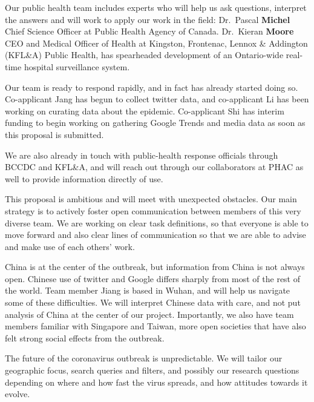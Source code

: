 Our public health team includes experts who will help us ask questions, interpret the answers and will work to apply our work in the field:
Dr.\ Pascal \textbf{Michel} Chief Science Officer at Public Health Agency of Canada. 
Dr.\ Kieran \textbf{Moore} CEO and Medical Officer of Health at Kingston, Frontenac, Lennox & Addington (KFL&A) Public Health, has spearheaded development of an Ontario-wide real-time hospital surveillance system.

Our team is ready to respond rapidly, and in fact has already started doing so. Co-applicant Jang has begun to collect twitter data, and co-applicant Li has been working on curating data about the epidemic. Co-applicant Shi has interim funding to begin working on gathering Google Trends and media data as soon as this proposal is submitted.

We are also already in touch with public-health response officials through BCCDC and KFL\&A, and will reach out through our collaborators at PHAC as well to provide information directly of use.


This proposal is ambitious and will meet with unexpected obstacles. Our main strategy is to actively foster open communication between members of this very diverse team. We are working on clear task definitions, so that everyone is able to move forward and also clear lines of communication so that we are able to advise and make use of each others' work.

China is at the center of the outbreak, but information from China is not always open. Chinese use of twitter and Google differs sharply from most of the rest of the world. Team member Jiang is based in Wuhan, and will help us navigate some of these difficulties. We will interpret Chinese data with care, and not put analysis of China at the center of our project. Importantly, we also have team members familiar with Singapore and Taiwan, more open societies that have also felt strong social effects from the outbreak.

The future of the coronavirus outbreak is unpredictable. We will tailor our geographic focus, search queries and filters, and possibly our research questions depending on where and how fast the virus spreads, and how attitudes towards it evolve. 
